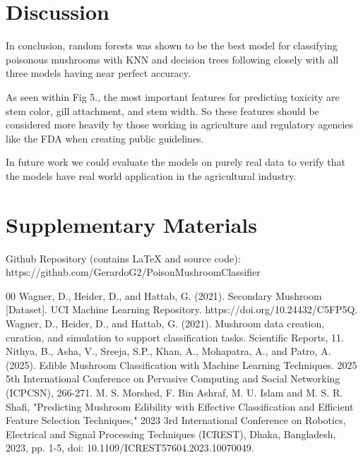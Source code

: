\documentclass[conference]{IEEEtran}
\begin{document}
\section{Discussion}

In conclusion, random forests was shown to be the best model for classifying poisonous mushrooms with KNN and decision trees following closely with all three models having near perfect accuracy. 

As seen within Fig 5., the most important features for predicting toxicity are stem color, gill attachment, and stem width. So these features should be considered more heavily by those working in agriculture and regulatory agencies like the FDA when creating public guidelines. 

In future work we could  evaluate the models on purely real data to verify that the models have real world application in the agricultural industry. 

\section{Supplementary Materials}
Github Repository (contains LaTeX and source code): https://github.com/GerardoG2/PoisonMushroomClassifier

\begin{thebibliography}{00}
 Wagner, D., Heider, D., and Hattab, G. (2021). Secondary Mushroom [Dataset]. UCI Machine Learning Repository. https://doi.org/10.24432/C5FP5Q.
 Wagner, D., Heider, D., and Hattab, G. (2021). Mushroom data creation, curation, and simulation to support classification tasks. Scientific Reports, 11.
 Nithya, B., Asha, V., Sreeja, S.P., Khan, A., Mohapatra, A., and Patro, A. (2025). Edible Mushroom Classification with Machine Learning Techniques. 2025 5th International Conference on Pervasive Computing and Social Networking (ICPCSN), 266-271.
 M. S. Morshed, F. Bin Ashraf, M. U. Islam and M. S. R. Shafi, "Predicting Mushroom Edibility with Effective Classification and Efficient Feature Selection Techniques," 2023 3rd International Conference on Robotics, Electrical and Signal Processing Techniques (ICREST), Dhaka, Bangladesh, 2023, pp. 1-5, doi: 10.1109/ICREST57604.2023.10070049.
\end{thebibliography}
\end{document}
